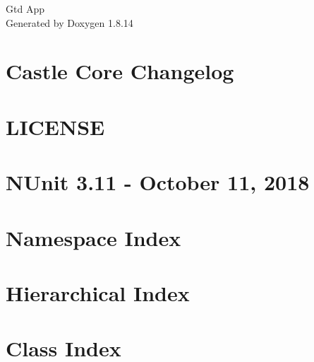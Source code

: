 \documentclass[twoside]{book}
\newcommand{\+}{\discretionary{\mbox{\scriptsize$\hookleftarrow$}}{}{}}
\newcommand{\clearemptydoublepage}{%
  \newpage{\pagestyle{empty}\cleardoublepage}%
}
\begin{document}
\begin{titlepage}
\vspace*{7cm}
\begin{center}%
{\Large Gtd App }\\
\vspace*{1cm}
{\large Generated by Doxygen 1.8.14}\\
\end{center}
\end{titlepage}
\clearemptydoublepage
{}
\tableofcontents
\clearemptydoublepage
{}

\chapter{Castle Core Changelog}
\label{md__c_1__projects__o_e_oenik_prog3_2018_2_ep7d0o__o_e_n_i_k__p_r_o_g3_2018_2__e_p7_d0_o_packages8ad2e7294e2f42bb95e3b81991b3569d}

\chapter{L\+I\+C\+E\+N\+SE}
\label{md__c_1__projects__o_e_oenik_prog3_2018_2_ep7d0o__o_e_n_i_k__p_r_o_g3_2018_2__e_p7_d0_o_packages49dfbfe7c7601bfdae53879e3e2cc9e3}

\chapter{N\+Unit 3.11 -\/ October 11, 2018}
\label{md__c_1__projects__o_e_oenik_prog3_2018_2_ep7d0o__o_e_n_i_k__p_r_o_g3_2018_2__e_p7_d0_o_packages5cdfbe88207ce380d4cdccfb82c0c269}

\chapter{Namespace Index}

\chapter{Hierarchical Index}

\chapter{Class Index}

\end{document}
